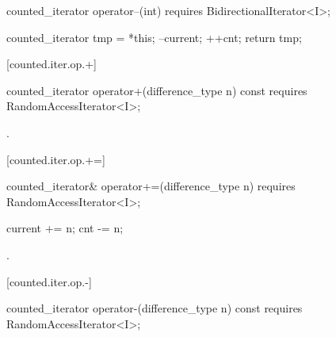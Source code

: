 \begin{addedblock}
%
%
\begin{itemdecl}
  counted_iterator operator--(int)
    requires BidirectionalIterator<I>;
\end{itemdecl}

\begin{itemdescr}
\pnum
\effects
\begin{codeblock}
counted_iterator tmp = *this;
--current;
++cnt;
return tmp;
\end{codeblock}
\end{itemdescr}

[counted.iter.op.+]{}

%
%
\begin{itemdecl}
  counted_iterator operator+(difference_type n) const
    requires RandomAccessIterator<I>;
\end{itemdecl}

\begin{itemdescr}
\pnum
\requires {}

\pnum
\returns {}.
\end{itemdescr}

[counted.iter.op.+=]{}

%
%
\begin{itemdecl}
  counted_iterator& operator+=(difference_type n)
    requires RandomAccessIterator<I>;
\end{itemdecl}

\begin{itemdescr}
\pnum
\requires {}

\pnum
\effects
\begin{codeblock}
current += n;
cnt -= n;
\end{codeblock}

\pnum
\returns {}.
\end{itemdescr}

[counted.iter.op.-]{}

%
%
\begin{itemdecl}
  counted_iterator operator-(difference_type n) const
    requires RandomAccessIterator<I>;
\end{itemdecl}


\end{addedblock}
